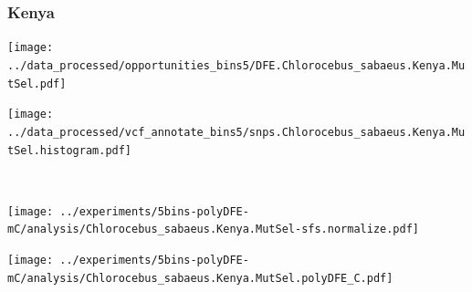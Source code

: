\subsubsection{Kenya}

\begin{minipage}{0.49\linewidth}
    \texttt{[image: ../data\_processed/opportunities\_bins5/DFE.Chlorocebus\_sabaeus.Kenya.MutSel.pdf]}
\end{minipage}
\begin{minipage}{0.49\linewidth}
    \texttt{[image: ../data\_processed/vcf\_annotate\_bins5/snps.Chlorocebus\_sabaeus.Kenya.MutSel.histogram.pdf]}
\end{minipage}
\\
\begin{minipage}{0.49\linewidth}
    \texttt{[image: ../experiments/5bins-polyDFE-mC/analysis/Chlorocebus\_sabaeus.Kenya.MutSel-sfs.normalize.pdf]}
\end{minipage}
\begin{minipage}{0.4\linewidth}
    \texttt{[image: ../experiments/5bins-polyDFE-mC/analysis/Chlorocebus\_sabaeus.Kenya.MutSel.polyDFE\_C.pdf]}
\end{minipage}
